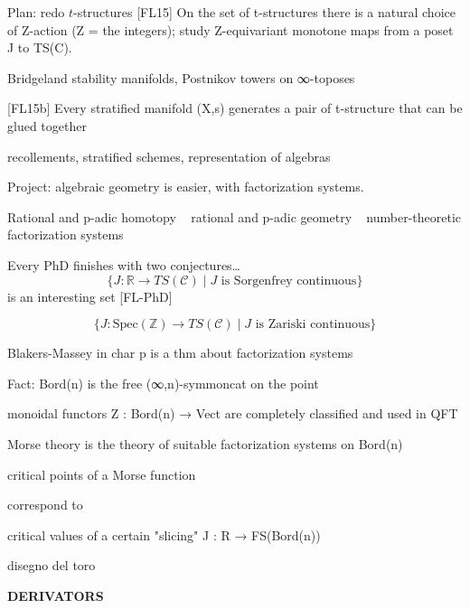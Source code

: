 \documentclass{beamer}
\begin{document}
%
%
%
\begin{frame}{Plan: redo $t$-structures}
[FL15] On the set of t-structures there is a natural choice of Z-action (Z = the integers); study Z-equivariant monotone maps from a poset J to TS(C).

Bridgeland stability manifolds, Postnikov towers on ∞-toposes

[FL15b] Every stratified manifold (X,s) generates a pair of t-structure that can be glued together

recollements, stratified schemes, representation of algebras

Project: algebraic geometry is easier, with factorization systems.

Rational and p-adic homotopy ~ rational and p-adic geometry ~ number-theoretic factorization systems

\end{frame}
%
%
%
%
%
\begin{frame}{Every PhD finishes with two conjectures\dots}
 \[\{ J \colon \mathbb R \to TS(\mathcal C) \mid J \text{ is Sorgenfrey continuous} \}\] 
 is an interesting set [FL-PhD]

 \[\{ J \colon \text{Spec}(\mathbb Z) \to TS(\mathcal C) \mid J \text{ is Zariski continuous} \}\]

 Blakers-Massey in char p is a thm about factorization systems
\end{frame}
%
%
%
%
\begin{frame}
  Fact: Bord(n) is the free (∞,n)-symmoncat on the point 

  monoidal functors Z : Bord(n) → Vect are completely classified and used in QFT

  Morse theory is the theory of suitable factorization systems on Bord(n)

  {critical points of a Morse function}

  correspond to

 {critical values of a certain "slicing" J : R → FS(Bord(n))}

 disegno del toro
\end{frame}
%
%
%
%
%
%
%
\begin{frame}
  \Huge\centering \bfseries DERIVATORS
\end{frame}
%
\end{document}
